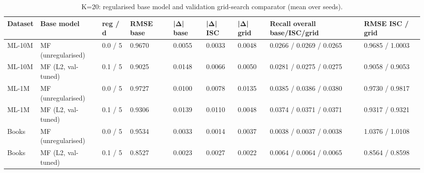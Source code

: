 \begin{table}[h]
\centering
\caption{K=20: regularised base model and validation grid-search comparator (mean over seeds).}
\small
\begin{tabular}{lllllllll}
\toprule
Dataset & Base model & reg / d & RMSE base & |Δ| base & |Δ| ISC & |Δ| grid & Recall overall base/ISC/grid & RMSE ISC / grid \\
\midrule
ML-10M & MF (unregularised) & 0.0 / 5 & 0.9670 & 0.0055 & 0.0033 & 0.0048 & 0.0266 / 0.0269 / 0.0265 & 0.9685 / 1.0003 \\
ML-10M & MF (L2, val-tuned) & 0.1 / 5 & 0.9025 & 0.0148 & 0.0066 & 0.0050 & 0.0281 / 0.0275 / 0.0275 & 0.9058 / 0.9053 \\
ML-1M & MF (unregularised) & 0.0 / 5 & 0.9727 & 0.0100 & 0.0078 & 0.0135 & 0.0385 / 0.0386 / 0.0380 & 0.9730 / 0.9817 \\
ML-1M & MF (L2, val-tuned) & 0.1 / 5 & 0.9306 & 0.0139 & 0.0110 & 0.0048 & 0.0374 / 0.0371 / 0.0371 & 0.9317 / 0.9321 \\
Books & MF (unregularised) & 0.0 / 5 & 0.9534 & 0.0033 & 0.0014 & 0.0037 & 0.0038 / 0.0037 / 0.0038 & 1.0376 / 1.0108 \\
Books & MF (L2, val-tuned) & 0.1 / 5 & 0.8527 & 0.0023 & 0.0027 & 0.0022 & 0.0064 / 0.0064 / 0.0065 & 0.8564 / 0.8598 \\
\bottomrule
\end{tabular}
\end{table}

